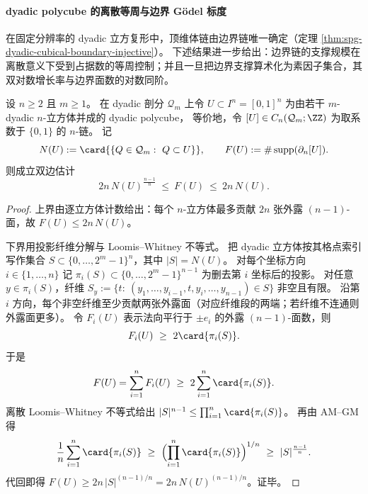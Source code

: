 
\paragraph{dyadic polycube 的离散等周与边界 Gödel 标度}\label{par:spg-dyadic-polyclube-isoperimetry-boundary-godel}
在固定分辨率的 dyadic 立方复形中，顶维体链由边界链唯一确定（定理 \ref{thm:spg-dyadic-cubical-boundary-injective}）。
下述结果进一步给出：边界链的支撑规模在离散意义下受到占据数的等周控制；并且一旦把边界支撑算术化为素因子集合，其双对数增长率与边界面数的对数同阶。

\begin{theorem}\label{thm:spg-dyadic-polyclube-discrete-isoperimetry}
设 \(n\ge 2\) 且 \(m\ge 1\)。
在 dyadic 剖分 \(\mathcal Q_m\) 上令 \(U\subset I^n=[0,1]^n\) 为由若干 \(m\)-dyadic \(n\)-立方体并成的 dyadic polycube，
等价地，令 \([U]\in C_n(\mathcal Q_m;\ZZ)\) 为取系数于 \(\{0,1\}\) 的 \(n\)-链。
记
\[
N(U):=\card{\{Q\in\mathcal Q_m:\ Q\subset U\}},
\qquad
F(U):=\#\operatorname{supp}(\partial_n[U]).
\]
则成立双边估计
\[
2n\,N(U)^{\frac{n-1}{n}}\ \le\ F(U)\ \le\ 2n\,N(U).
\]
\end{theorem}
\begin{proof}
上界由逐立方体计数给出：每个 \(n\)-立方体最多贡献 \(2n\) 张外露 \((n-1)\)-面，故 \(F(U)\le 2n\,N(U)\)。
\par
下界用投影纤维分解与 Loomis--Whitney 不等式。
把 dyadic 立方体按其格点索引写作集合 \(S\subset\{0,\dots,2^m-1\}^n\)，其中 \(|S|=N(U)\)。
对每个坐标方向 \(i\in\{1,\dots,n\}\) 记 \(\pi_i(S)\subset\{0,\dots,2^m-1\}^{n-1}\) 为删去第 \(i\) 坐标后的投影。
对任意 \(y\in\pi_i(S)\)，纤维
\(
S_y:=\{t:\ (y_1,\dots,y_{i-1},t,y_i,\dots,y_{n-1})\in S\}
\)
非空且有限。
沿第 \(i\) 方向，每个非空纤维至少贡献两张外露面（对应纤维段的两端；若纤维不连通则外露面更多）。
令 \(F_i(U)\) 表示法向平行于 \(\pm e_i\) 的外露 \((n-1)\)-面数，则
\[
F_i(U)\ \ge\ 2\card{\pi_i(S)}.
\]
于是
\[
F(U)=\sum_{i=1}^n F_i(U)\ \ge\ 2\sum_{i=1}^n\card{\pi_i(S)}.
\]
离散 Loomis--Whitney 不等式给出 \(|S|^{n-1}\le \prod_{i=1}^n\card{\pi_i(S)}\)。
再由 AM--GM 得
\[
\frac{1}{n}\sum_{i=1}^n\card{\pi_i(S)}
\ \ge\
\Bigl(\prod_{i=1}^n\card{\pi_i(S)}\Bigr)^{1/n}
\ \ge\
|S|^{\frac{n-1}{n}}.
\]
代回即得 \(F(U)\ge 2n\,|S|^{(n-1)/n}=2n\,N(U)^{(n-1)/n}\)。证毕。
\end{proof}


